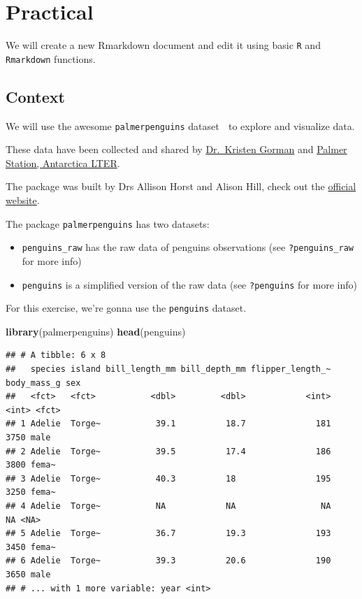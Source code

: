 \documentclass[
  12pt,
]{book}
\newenvironment{Shaded}{\begin{snugshade}}{\end{snugshade}}
\newcommand{\KeywordTok}[1]{\textcolor[rgb]{0.13,0.29,0.53}{\textbf{#1}}}
\newcommand{\NormalTok}[1]{#1}
\providecommand{\tightlist}{%
  \setlength{\itemsep}{0pt}\setlength{\parskip}{0pt}}
\begin{document}
\hypertarget{practical}{%
\section{Practical}\label{practical}}

We will create a new Rmarkdown document and edit it using basic \texttt{R} and \texttt{Rmarkdown} functions.

\hypertarget{context}{%
\subsection{Context}\label{context}}

We will use the awesome \texttt{palmerpenguins} dataset 🐧 to explore and visualize data.

These data have been collected and shared by \href{https://www.uaf.edu/cfos/people/faculty/detail/kristen-gorman.php}{Dr.~Kristen Gorman} and \href{https://pal.lternet.edu/}{Palmer Station, Antarctica LTER}.

The package was built by Drs Allison Horst and Alison Hill, check out the \href{https://allisonhorst.github.io/palmerpenguins/}{official website}.

The package \texttt{palmerpenguins} has two datasets:

\begin{itemize}
\tightlist
\item
  \texttt{penguins\_raw} has the raw data of penguins observations (see \texttt{?penguins\_raw} for more info)
\item
  \texttt{penguins} is a simplified version of the raw data (see \texttt{?penguins} for more info)
\end{itemize}

For this exercise, we're gonna use the \texttt{penguins} dataset.

\begin{Shaded}
\begin{Highlighting}[]
\KeywordTok{library}\NormalTok{(palmerpenguins)}
\KeywordTok{head}\NormalTok{(penguins)}
\end{Highlighting}
\end{Shaded}

\begin{verbatim}
## # A tibble: 6 x 8
##   species island bill_length_mm bill_depth_mm flipper_length_~ body_mass_g sex  
##   <fct>   <fct>           <dbl>         <dbl>            <int>       <int> <fct>
## 1 Adelie  Torge~           39.1          18.7              181        3750 male 
## 2 Adelie  Torge~           39.5          17.4              186        3800 fema~
## 3 Adelie  Torge~           40.3          18                195        3250 fema~
## 4 Adelie  Torge~           NA            NA                 NA          NA <NA> 
## 5 Adelie  Torge~           36.7          19.3              193        3450 fema~
## 6 Adelie  Torge~           39.3          20.6              190        3650 male 
## # ... with 1 more variable: year <int>
\end{verbatim}
\end{document}
